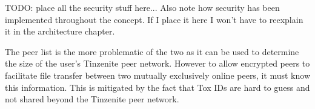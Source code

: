 TODO: place all the security stuff here...
Also note how security has been implemented throughout the concept.
If I place it here I won't have to reexplain it in the architecture chapter.

The peer list is the more problematic of the two as it can be used to determine the size of the user's Tinzenite peer network.
However to allow encrypted peers to facilitate file transfer between two mutually exclusively online peers, it must know this information.
This is mitigated by the fact that Tox IDs are hard to guess and not shared beyond the Tinzenite peer network.
